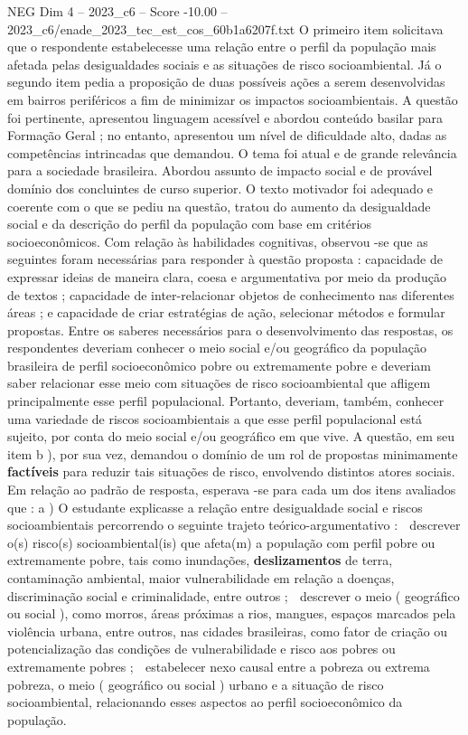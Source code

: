 \begin{textsample}{NEG Dim 4 – 2023\_c6 – Score -10.00 – 2023\_c6/enade\_2023\_tec\_est\_cos\_60b1a6207f.txt}
O primeiro item solicitava que o respondente estabelecesse uma relação entre o perfil da população mais afetada pelas desigualdades sociais e as situações de risco socioambiental.
Já o segundo item pedia a proposição de duas possíveis ações a serem desenvolvidas em bairros periféricos a fim de minimizar os impactos socioambientais.
A questão foi pertinente, apresentou linguagem acessível e abordou conteúdo basilar para Formação Geral ; no entanto, apresentou um nível de dificuldade alto, dadas as competências intrincadas que demandou.
O tema foi atual e de grande relevância para a sociedade brasileira.
Abordou assunto de impacto social e de provável domínio dos concluintes de curso superior.
O texto motivador foi adequado e coerente com o que se pediu na questão, tratou do aumento da desigualdade social e da descrição do perfil da população com base em critérios socioeconômicos.
Com relação às habilidades cognitivas, observou -se que as seguintes foram necessárias para responder à questão proposta : capacidade de expressar ideias de maneira clara, coesa e argumentativa por meio da produção de textos ; capacidade de inter-relacionar objetos de conhecimento nas diferentes áreas ; e capacidade de criar estratégias de ação, selecionar métodos e formular propostas.
Entre os saberes necessários para o desenvolvimento das respostas, os respondentes deveriam conhecer o meio social e/ou geográfico da população brasileira de perfil socioeconômico pobre ou extremamente pobre e deveriam saber relacionar esse meio com situações de risco socioambiental que afligem principalmente esse perfil populacional.
Portanto, deveriam, também, conhecer uma variedade de riscos socioambientais a que esse perfil populacional está sujeito, por conta do meio social e/ou geográfico em que vive.
A questão, em seu item b ), por sua vez, demandou o domínio de um rol de propostas minimamente \textbf{factíveis} para reduzir tais situações de risco, envolvendo distintos atores sociais.
Em relação ao padrão de resposta, esperava -se para cada um dos itens avaliados que : a ) O estudante explicasse a relação entre desigualdade social e riscos socioambientais percorrendo o seguinte trajeto teórico-argumentativo :  descrever o(s) risco(s) socioambiental(is) que afeta(m) a população com perfil pobre ou extremamente pobre, tais como inundações, \textbf{deslizamentos} de terra, contaminação ambiental, maior vulnerabilidade em relação a doenças, discriminação social e criminalidade, entre outros ;  descrever o meio ( geográfico ou social ), como morros, áreas próximas a rios, mangues, espaços marcados pela violência urbana, entre outros, nas cidades brasileiras, como fator de criação ou potencialização das condições de vulnerabilidade e risco aos pobres ou extremamente pobres ;  estabelecer nexo causal entre a pobreza ou extrema pobreza, o meio ( geográfico ou social ) urbano e a situação de risco socioambiental, relacionando esses aspectos ao perfil socioeconômico da população.

\end{textsample}
